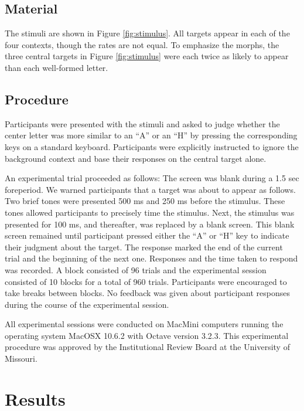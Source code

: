\documentclass[english,floatsintext,man]{apa6}
\theoremstyle{definition}
\theoremstyle{definition}
\theoremstyle{definition}
\theoremstyle{remark}
\begin{document}
\subsection{Material}\label{material}

The stimuli are shown in Figure \ref{fig:stimulus}. All targets appear
in each of the four contexts, though the rates are not equal. To
emphasize the morphs, the three central targets in Figure
\ref{fig:stimulus} were each twice as likely to appear than each
well-formed letter.

\subsection{Procedure}\label{procedure}

Participants were presented with the stimuli and asked to judge whether
the center letter was more similar to an \enquote{A} or an \enquote{H}
by pressing the corresponding keys on a standard keyboard. Participants
were explicitly instructed to ignore the background context and base
their responses on the central target alone.

An experimental trial proceeded as follows: The screen was blank during
a 1.5 sec foreperiod. We warned participants that a target was about to
appear as follows. Two brief tones were presented 500 ms and 250 ms
before the stimulus. These tones allowed participants to precisely time
the stimulus. Next, the stimulus was presented for 100 ms, and
thereafter, was replaced by a blank screen. This blank screen remained
until participant pressed either the \enquote{A} or \enquote{H} key to
indicate their judgment about the target. The response marked the end of
the current trial and the beginning of the next one. Responses and the
time taken to respond was recorded. A block consisted of 96 trials and
the experimental session consisted of 10 blocks for a total of 960
trials. Participants were encouraged to take breaks between blocks. No
feedback was given about participant responses during the course of the
experimental session.

All experimental sessions were conducted on MacMini computers running
the operating system MacOSX 10.6.2 with Octave version 3.2.3. This
experimental procedure was approved by the Institutional Review Board at
the University of Missouri.

\section{Results}\label{results}
\end{document}
